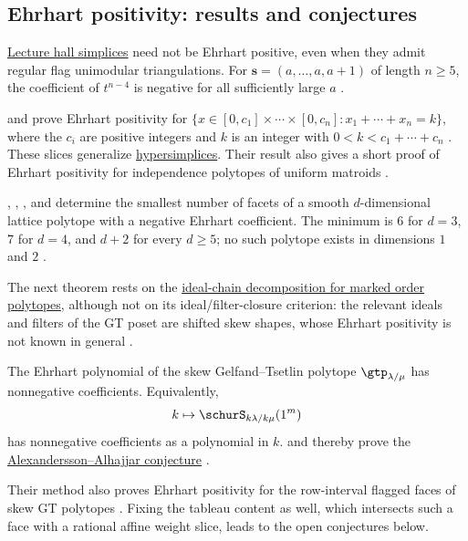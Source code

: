 \subsection[ehrhartConjecturalPositivity]{Ehrhart positivity: results and conjectures}

\hyperref[lectureHallSimplex]{Lecture hall simplices} need not be Ehrhart
positive, even when they admit regular flag unimodular triangulations.
For $\mathbf{s}=(a,\dotsc,a,a+1)$ of length $n\geq5$, the coefficient
of $t^{n-4}$ is negative for all sufficiently large $a$
\cite[Thm.~3.5 and Cor.~4.16]{CaicedoJuhnkePoullot2025x}.

 and  prove Ehrhart positivity for
\(\{x\in[0,c_1]\times\dotsb\times[0,c_n]:x_1+\dotsb+x_n=k\}\),
where the \(c_i\) are positive integers and \(k\) is an integer with
\(0<k<c_1+\dotsb+c_n\) \cite[Thm.~1.1]{FerroniMcGinnis2025}.
These slices generalize \hyperref[hypersimplex]{hypersimplices}.
Their result also gives a short proof of Ehrhart positivity for independence
polytopes of uniform matroids \cite[Cor.~6.4]{FerroniMcGinnis2025}.

, , , and
 determine the smallest number of facets of a smooth
$d$-dimensional lattice polytope with a negative Ehrhart coefficient.  The
minimum is $6$ for $d=3$, $7$ for $d=4$, and $d+2$ for every $d\geq5$;
no such polytope exists in dimensions $1$ and $2$
\cite[Thm.~1.1]{LiuTangTaoZhang2026x}.

The next theorem rests on the
\hyperref[markedOrderPolytopePositivity]{ideal-chain decomposition for marked
order polytopes}, although not on its ideal/filter-closure criterion: the
relevant ideals and filters of the GT poset are shifted skew shapes, whose
Ehrhart positivity is not known in general \cite[Sec.~1]{JochemkoMenon2026x}.

\begin{theorem}
The Ehrhart polynomial of the skew Gelfand--Tsetlin polytope
\(\gtp_{\lambda/\mu}\) has nonnegative coefficients.  Equivalently,
\[
  k\mapsto \schurS_{k\lambda/k\mu}(1^m)
\]
has nonnegative coefficients as a polynomial in \(k\).
 and  thereby prove the
\hyperref[skewGTEhrhartPositivity]{Alexandersson--Alhajjar conjecture}
\cite[Conj.~7]{AlexanderssonAlhajjar2018x}.
\end{theorem}

Their method also proves Ehrhart positivity for the row-interval flagged
faces of skew GT polytopes \cite[Sec.~3.2]{JochemkoMenon2026x}.  Fixing the
tableau content as well, which intersects such a face with a rational affine
weight slice, leads to the open conjectures below.

